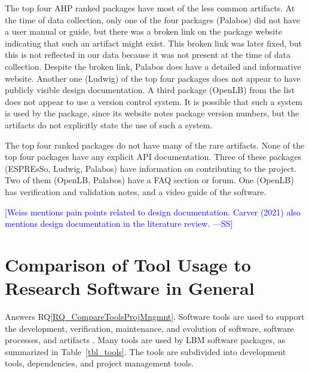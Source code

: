 \documentclass[final, 3p, times, authoryear]{elsarticle}
\newcommand{\authornote}[3]{\textcolor{#1}{[#3 ---#2]}}
\newcommand{\authornote}[3]{}
\newcommand{\wss}[1]{\authornote{blue}{SS}{#1}} %
\newcommand{\rqref}[1]{RQ\ref{#1}}
\begin{document}
The top four AHP ranked packages have most of the less common artifacts. At the
time of data collection, only one of the four packages (Palabos) did not have a
user manual or guide, but there was a broken link on the package website
indicating that such an artifact might exist. This broken link was later fixed,
but this is not reflected in our data because it was not present at the time of
data collection. Despite the broken link, Palabos does have a detailed and
informative website. Another one (Ludwig) of the top four packages does not
appear to have publicly visible design documentation. A third package (OpenLB)
from the list does not appear to use a version control system. It is possible
that such a system is used by the package, since its website notes package
version numbers, but the artifacts do not explicitly state the use of such a
system.

The top four ranked packages do not have many of the rare artifacts. None of the
top four packages have any explicit API documentation. Three of these packages
(ESPREsSo, Ludwig, Palabos) have information on contributing to the project. Two
of them (OpenLB, Palabos) have a FAQ section or forum. One (OpenLB) has
verification and validation notes, and a video guide of the software. 

\wss{Weiss mentions pain points related to design documentation.  Carver (2021) 
also mentions design documentation in the literature review.}

\section{Comparison of Tool Usage to Research Software in General}
\label{Sec_CompareTools}

Answers \rqref{RQ_CompareToolsProjMngmnt}.  Software tools are used to support
the development, verification, maintenance, and evolution of software, software
processes, and artifacts \citep{ghezzi1991fundamentals}. Many tools are used by
LBM software packages, as summarized in Table~\ref{tbl_tools}.  The tools are
subdivided into development tools, dependencies, and project management tools.
\end{document}
